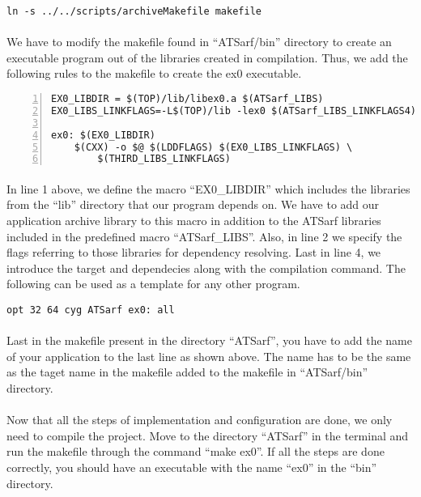 \documentclass{article}
\begin{document}
\begin{Verbatim}
ln -s ../../scripts/archiveMakefile makefile
\end{Verbatim}

\paragraph{}
We have to modify the makefile found in ``ATSarf/bin'' directory to create an executable program out of the libraries created in compilation. Thus, we add the following rules to the makefile to create the ex0 executable.

\begin{Verbatim}[numbers=left]
EX0_LIBDIR = $(TOP)/lib/libex0.a $(ATSarf_LIBS)
EX0_LIBS_LINKFLAGS=-L$(TOP)/lib -lex0 $(ATSarf_LIBS_LINKFLAGS4)

ex0: $(EX0_LIBDIR)
	$(CXX) -o $@ $(LDDFLAGS) $(EX0_LIBS_LINKFLAGS) \
		$(THIRD_LIBS_LINKFLAGS)
\end{Verbatim}

\paragraph{}
In line 1 above, we define the macro ``EX0\_LIBDIR'' which includes the libraries from the ``lib'' directory that our program depends on. We have to add our application archive library to this macro in addition to the ATSarf libraries included in the predefined macro ``ATSarf\_LIBS''. Also, in line 2 we specify the flags referring to those libraries for dependency resolving. Last in line 4, we introduce the target and dependecies along with the compilation command. The following can be used as a template for any other program.

\begin{verbatim}
opt 32 64 cyg ATSarf ex0: all
\end{verbatim}

\paragraph{}
Last in the makefile present in the directory ``ATSarf'', you have to add the name of your application to the last line as shown above. The name has to be the same as the taget name in the makefile added to the makefile in ``ATSarf/bin'' directory.

\paragraph{}
Now that all the steps of implementation and configuration are done, we only need to compile the project. Move to the directory ``ATSarf'' in the terminal and run the makefile through the command ``make ex0''. If all the steps are done correctly, you should have an executable with the name ``ex0'' in the ``bin'' directory.
\end{document}
